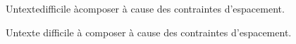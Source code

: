 \documentclass[12pt,a4paper,twoside]{article}
\begin{document}
Un\hspace{1cm}texte\hspace{1cm}difficile%
\hspace{1cm}à\hspace{1cm}composer à cause
des contraintes d’espacement.

Un\hspace{1cm minus4mm}texte%
\hspace{1cm minus4mm}difficile%
\hspace{1cm minus1cm}à%
\hspace{2cm plus1cm}composer à
cause des contraintes d’espacement.
\end{document}
